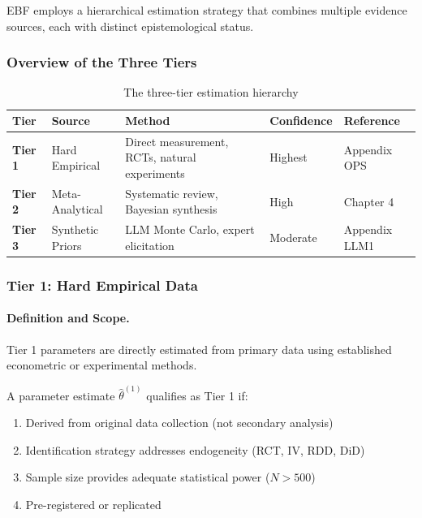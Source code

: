 EBF employs a hierarchical estimation strategy that combines multiple 
evidence sources, each with distinct epistemological status.

\subsubsection{Overview of the Three Tiers}

\begin{table}[h]
\centering
\small
\begin{tabular}{p{1.5cm}p{3cm}p{3.5cm}p{2cm}p{2cm}}
\toprule
\textbf{Tier} & \textbf{Source} & \textbf{Method} & \textbf{Confidence} & \textbf{Reference} \\
\midrule
\textbf{Tier 1} & Hard Empirical & Direct measurement, RCTs, natural experiments & Highest & Appendix OPS \\
\textbf{Tier 2} & Meta-Analytical & Systematic review, Bayesian synthesis & High & Chapter 4 \\
\textbf{Tier 3} & Synthetic Priors & LLM Monte Carlo, expert elicitation & Moderate & Appendix LLM1 \\
\bottomrule
\end{tabular}
\caption{The three-tier estimation hierarchy}
\label{tab:three-tiers}
\end{table}

\subsubsection{Tier 1: Hard Empirical Data}

\paragraph{Definition and Scope.}

Tier 1 parameters are directly estimated from primary data using established 
econometric or experimental methods.

\begin{definition}
A parameter estimate $\hat{\theta}^{(1)}$ qualifies as Tier 1 if:
\begin{enumerate}
    \item Derived from original data collection (not secondary analysis)
    \item Identification strategy addresses endogeneity (RCT, IV, RDD, DiD)
    \item Sample size provides adequate statistical power ($N > 500$)
    \item Pre-registered or replicated
\end{enumerate}
\end{definition}

